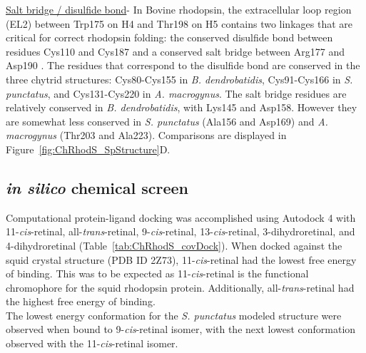 \indent \underline{Salt bridge / disulfide bond}- In Bovine rhodopsin, the extracellular loop region (EL2) between Trp175 on H4 and Thr198 on H5 contains two linkages that are critical for correct rhodopsin folding: the conserved disulfide bond between residues Cys110 and Cys187 and a conserved salt bridge between Arg177 and Asp190 \cite{Smith2010}. The residues that correspond to the disulfide bond are conserved in the three chytrid structures: Cys80-Cys155 in \textit{B. dendrobatidis}, Cys91-Cys166 in \textit{S. punctatus}, and Cys131-Cys220 in \textit{A. macrogynus}. The salt bridge residues are relatively conserved in \textit{B. dendrobatidis}, with Lys145 and Asp158. However they are somewhat less conserved in \textit{S. punctatus} (Ala156 and Asp169) and \textit{A. macrogynus} (Thr203 and Ala223). Comparisons are displayed in Figure~\ref{fig:ChRhodS_SpStructure}D.\\

\subsection*{\textit{in silico} chemical screen}
Computational protein-ligand docking was accomplished using Autodock 4 with 11-\textit{cis}-retinal, all-\textit{trans}-retinal, 9-\textit{cis}-retinal, 13-\textit{cis}-retinal, 3-dihydroretinal, and 4-dihydroretinal (Table~\ref{tab:ChRhodS_covDock}). When docked against the squid crystal structure (PDB ID 2Z73), 11-\textit{cis}-retinal had the lowest free energy of binding. This was to be expected as 11-\textit{cis}-retinal is the functional chromophore for the squid rhodopsin protein. Additionally, all-\textit{trans}-retinal had the highest free energy of binding.\\
\indent The lowest energy conformation for the \textit{S. punctatus} modeled structure were observed when bound to 9-\textit{cis}-retinal isomer, with the next lowest conformation observed with the 11-\textit{cis}-retinal isomer.\\
